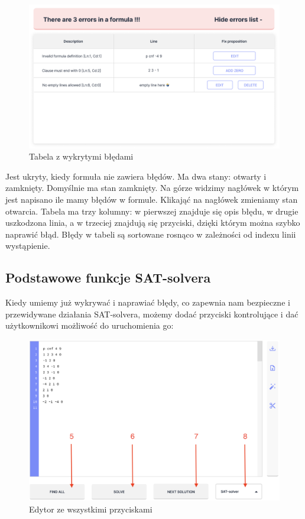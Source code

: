 \documentclass[a4paper,12pt,oneside]{book}
\theoremstyle{definition}
\begin{document}
\begin{figure}[ht]
    \centering
    \includegraphics[width=14.30cm]{6}
    \caption{Tabela z wykrytymi błędami}
    \label{fig:6}
\end{figure}

\noindent Jest ukryty, kiedy formuła nie zawiera błędów. Ma dwa stany: otwarty i zamknięty. Domyślnie ma stan zamknięty. Na górze widzimy nagłówek w którym jest napisano ile mamy błędów w formule. Klikająć na nagłówek zmieniamy stan otwarcia. Tabela ma trzy kolumny: w pierwszej znajduje się opis błędu, w drugie uszkodzona linia, a w trzeciej znajdują się przyciski, dzięki którym można szybko naprawić błąd. Błędy w tabeli są sortowane rosnąco w zależności od indexu linii wystąpienie.

\subsection{Podstawowe funkcje SAT-solvera}

Kiedy umiemy już wykrywać i naprawiać błędy, co zapewnia nam bezpieczne i przewidywane działania SAT-solvera, możemy dodać przyciski kontrolujące i dać użytkownikowi możliwość do uruchomienia go:

\begin{figure}[ht]
    \centering
    \includegraphics[width=14.30cm]{7}
    \caption{Edytor ze wszystkimi przyciskami}
    \label{fig:7}
\end{figure}
\end{document}
